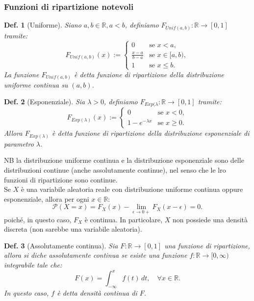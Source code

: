 \documentclass{article}
\newtheorem{definition}{Def.}[section]
\begin{document}
\subsubsection{Funzioni di ripartizione notevoli}
\begin{definition}[Uniforme]
	Siano $a, b \in \mathbb{R}, a<b$, definiamo $F_{Unif(a, b)}: \mathbb{R} \to
	[0, 1]$ tramite:
	\begin{equation*}
		F_{Unif(a, b)}(x) := 
		\begin{cases}
			0 & \text{se } x < a,\\
			\frac{x - a}{b - a} & \text{se } x \in [a, b),\\
			1 & \text{se } x \leq b.
		\end{cases}
	\end{equation*}
	La funzione $F_{Unif(a, b)}$ è detta funzione di ripartizione della
	distribuzione uniforme continua su $(a, b)$.
\end{definition}

\begin{definition}[Esponenziale]
	Sia $\lambda > 0$, definiamo $F_{Exp(\lambda}: \mathbb{R} \to
	[0, 1]$ tramite:
	\begin{equation*}
		F_{Exp(\lambda)}(x) := 
		\begin{cases}
			0 & \text{se } x < 0,\\
			1 - e^{-\lambda x} & \text{se } x \geq 0.
		\end{cases}
	\end{equation*}
	Allora $F_{Exp(\lambda)}$ è detta funzione di ripartizione della distribuzione
	esponenziale di parametro $\lambda$.
\end{definition}

NB la distribuzione uniforme continua e la distribuzione esponenziale sono delle
distribuzioni continue (anche assolutamente continue), nel senso che le lro
funzioni di ripartizione sono continue.\\
Se $X$ è una variabile aleatoria reale con distribuzione uniforme continua
oppure esponenziale, allora per ogni $x \in \mathbb{R}$:
\begin{equation*}
	\mathcal{P}(X = x) = F_X(x) - \lim_{\epsilon \to 0+} F_X(x - \epsilon) = 0.
\end{equation*}
poiché, in questo caso, $F_X$ è continua.
In particolare, $X$ non possiede una densità discreta (non sarebbe una variabile
aleatoria).

\begin{definition}[Assolutamente continua]
	Sia $F: \mathbb{R} \to [0, 1]$ una funzione di ripartizione, allora si diche
	assolutamente continua se esiste una funzione $f: \mathbb{R} \to [0, \infty)$
	integrabile tale che:
	\begin{equation}
		\label{eq:abs_continuity}
		F(x) = \int_{-\infty}^x f(t) \, dt, \quad \forall x \in \mathbb{R}.
	\end{equation}
	In questo caso, $f$ è detta densità continua di $F$.
\end{definition}
\end{document}

